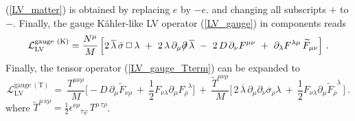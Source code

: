 \documentclass[12pt]{revtex4}
\newcommand{\slashed}[1]{\hbox{{$#1$}\llap{$/$}}}
\begin{document}
(\ref{LV_matter}) is obtained by replacing $e$ by $-e$.   and changing
all subscripts $+$ to $-$.  Finally, the gauge K\"ahler-like LV operator
(\ref{LV_gauge}) in components reads 
\begin{equation}
\label{LV_gauge_comp}
\mathcal{L}_{\mathrm{LV}}^{\mathrm{gauge\ (K)}} =  
\frac {N^\mu}{M} \, 
\Big[
2\, \overline{\lambda}\,\bar \sigma\, \Box\, 
   \lambda 
~+~
2\, \lambda\, \partial_\mu \slashed{\partial}\, 
   \overline{\lambda} 
~-~ 
2\, D\, \partial_\nu F^{\mu\nu}
~+~ 
\partial_\lambda F^{\lambda\mu}\, 
\widetilde{F}_{\mu\nu}  
\Big]~.
\end{equation}
Finally, the tensor operator (\ref{LV_gauge_Tterm}) can be expanded to
\begin{equation} 
\mathcal{L}_{\mathrm{LV}}^{\mathrm{gauge\ (T)}}  ~=~ 
\frac {T^{\mu\nu\rho} }{M}
\Big[
   - D\, \partial_\mu \widetilde{F}_{\nu\rho} 
   ~+~
   \frac{1}{2}
   F_{\nu\lambda}\partial_\mu F_\rho^{\phantom{\rho}\lambda}
\Big] 
~+~ 
\frac {\tilde T^{\mu\nu\rho} }{M}
\Big[\,
    2\, \overline{\lambda}\, \partial_\mu \partial_\nu
    \overline{\sigma}_\rho \lambda
    ~+~
    \frac{1}{2} F_{\nu\lambda} \partial_\mu
    \widetilde{F}_\rho^{\phantom{\rho}\lambda}
    \,
\Big]~.
\label{LV_gauge_Tterm_comp}
\end{equation}
where 
\(
\tilde T^{\mu\, \nu\rho} = 
\frac{1}{2} \epsilon^{\nu\rho}{}_{\tau\varphi} \, T^{\mu\,\tau\rho}
\). 
\end{document}
